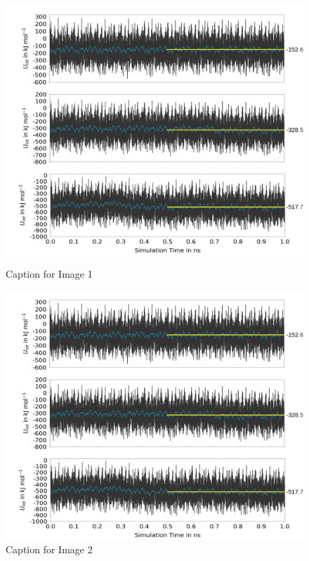 \documentclass[11pt]{article}
\begin{document}
\begin{figure}[htbp]
  \centering
  \begin{minipage}[b]{0.45\textwidth}
    \includegraphics[width=\textwidth]{Images/3Energies.png}
    \caption{Caption for Image 1}
  \end{minipage}
  \hfill
  \begin{minipage}[b]{0.45\textwidth}
    \includegraphics[width=\textwidth]{Images/3Energies.png}
    \caption{Caption for Image 2}
  \end{minipage}
\end{figure}


\end{document}
